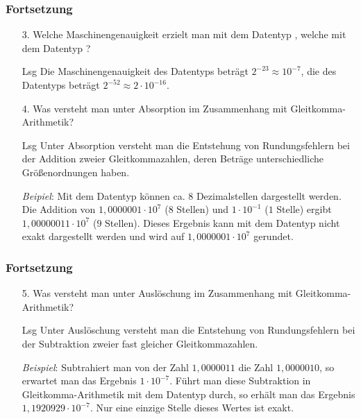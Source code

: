 \begin{frame}[t]%
  \frametitle{Fortsetzung}%
\centering
\medskip

\begin{enumerate}
\item[3.]
Welche Maschinengenauigkeit erzielt man mit dem Datentyp , welche mit dem Datentyp ?

\item[Lsg]
Die Maschinengenauigkeit des Datentyps  beträgt $2^{-23} \approx 10^{-7}$, die des Datentyps  beträgt $2^{-52} \approx 2 \cdot 10^{-16}$.

\item[4.]
Was versteht man unter Absorption im Zusammenhang mit Gleitkomma-Arithmetik?

\item[Lsg]
Unter Absorption versteht man die Entstehung von Rundungsfehlern bei der Addition zweier Gleitkommazahlen, deren Beträge unterschiedliche Größenordnungen haben.

\emph{Beipiel}: Mit dem Datentyp  können ca{.} $8$ Dezimalstellen dargestellt werden.
Die Addition von $1{,}0000001 \cdot 10^7$ ($8$ Stellen) und $1 \cdot 10^{-1}$ ($1$ Stelle) ergibt $1{,}00000011 \cdot 10^7$ ($9$ Stellen).
Dieses Ergebnis kann mit dem Datentyp  nicht exakt dargestellt werden und wird auf $1{,}0000001 \cdot 10^7$ gerundet.
\end{enumerate}
\end{frame}

\begin{frame}[t]%
  \frametitle{Fortsetzung}%
\centering
\medskip

\begin{enumerate}
\item[5.]
Was versteht man unter Auslöschung im Zusammenhang mit Gleitkomma-Arithmetik?

\item[Lsg]
Unter Auslöschung versteht man die Entstehung von Rundungsfehlern bei der Subtraktion zweier fast gleicher Gleitkommazahlen.

\emph{Beispiel}: Subtrahiert man von der Zahl $1{,}0000011$ die Zahl $1{,}0000010$, so erwartet man das Ergebnis $1 \cdot 10^{-7}$.
Führt man diese Subtraktion in Gleitkomma-Arithmetik mit dem Datentyp  durch, so erhält man das Ergebnis $1{,}1920929 \cdot 10^{-7}$.
Nur eine einzige Stelle dieses Wertes ist exakt.
\end{enumerate}

\end{frame}
